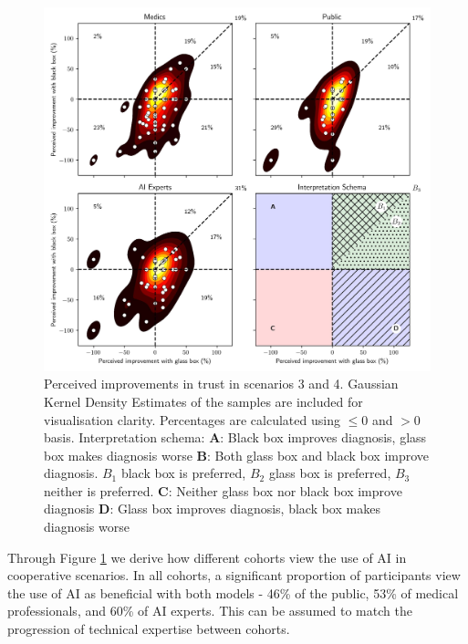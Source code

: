 \documentclass[manuscript,screen,review]{acmart}
\begin{document}
\begin{figure}[h!]
    \centering
    \includegraphics[width=\textwidth]{graphics/Doctor_improvements_cooperation_scatter.jpg}
    \caption{\centering Perceived improvements in trust in scenarios 3 and 4. Gaussian Kernel Density Estimates of the samples are included for visualisation clarity. Percentages are calculated using $\leq 0$ and $>0$ basis.\hspace{\textwidth} Interpretation schema: \textbf{A}: Black box improves diagnosis, glass box makes diagnosis worse \hspace{\textwidth} \textbf{B}: Both glass box and black box improve diagnosis. \textbf{$B_1$} black box is preferred, \textbf{$B_2$} glass box is preferred, $B_3$ neither is preferred. \textbf{C}: Neither glass box nor black box improve diagnosis \textbf{D}: Glass box improves diagnosis, black box makes diagnosis worse}
    \label{fig:improvement}
\end{figure}

Through Figure \ref{fig:improvement} we derive how different cohorts view the use of AI in cooperative scenarios. In all cohorts, a significant proportion of participants view the use of AI as beneficial with both models - 46\% of the public, 53\% of medical professionals, and 60\% of AI experts. This can be assumed to match the progression of technical expertise between cohorts.
\end{document}
